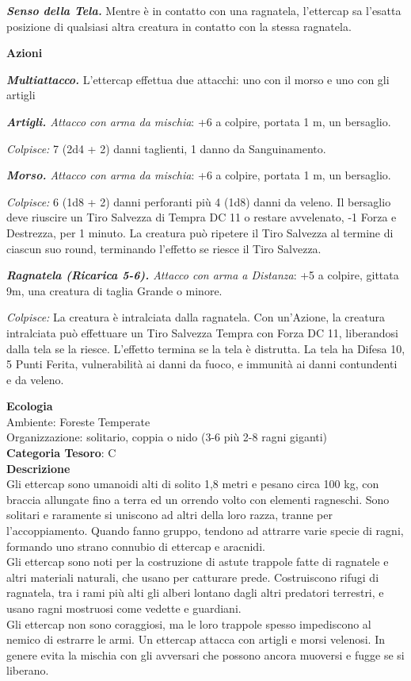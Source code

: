 \begin{multicols}{2}
{\emph{\textbf{Senso della Tela.}} Mentre è in contatto con una ragnatela, l'ettercap sa l'esatta posizione di qualsiasi altra creatura in contatto con la stessa ragnatela.

\textbf{Azioni}

\emph{\textbf{Multiattacco.}} L'ettercap effettua due attacchi: uno con il morso e uno con gli artigli

\emph{\textbf{Artigli.} Attacco con arma da mischia}: +6 a colpire, portata 1 m, un bersaglio.

\emph{Colpisce:} 7 (2d4 + 2) danni taglienti, 1 danno da Sanguinamento.

\emph{\textbf{Morso.} Attacco con arma da mischia}: +6 a colpire, portata 1 m, un bersaglio.

\emph{Colpisce:} 6 (1d8 + 2) danni perforanti più 4 (1d8) danni da veleno. Il bersaglio deve riuscire un Tiro Salvezza di Tempra DC 11 o restare avvelenato, -1 Forza e Destrezza, per 1 minuto. La creatura può ripetere il Tiro Salvezza al termine di ciascun suo round, terminando l'effetto se riesce il Tiro Salvezza.

\emph{\textbf{Ragnatela (Ricarica 5-6).} Attacco con arma a Distanza}: +5 a colpire, gittata 9m, una creatura di taglia Grande o minore.

\emph{Colpisce:} La creatura è intralciata dalla ragnatela. Con un'Azione, la creatura intralciata può effettuare un Tiro Salvezza Tempra con Forza DC 11, liberandosi dalla tela se la riesce. L'effetto termina se la tela è distrutta. La tela ha Difesa 10, 5 Punti Ferita, vulnerabilità ai danni da fuoco, e immunità ai danni contundenti e da veleno.

\textbf{Ecologia}\\
Ambiente: Foreste Temperate\\
Organizzazione: solitario, coppia o nido (3-6 più 2-8 ragni giganti)\\
\textbf{Categoria Tesoro}: C\\
\textbf{Descrizione}\\
Gli ettercap sono umanoidi alti di solito 1,8 metri e pesano circa 100 kg, con braccia allungate fino a terra ed un orrendo volto con elementi ragneschi. Sono solitari e raramente si uniscono ad altri della loro razza, tranne per l'accoppiamento. Quando fanno gruppo, tendono ad attrarre varie specie di ragni, formando uno strano connubio di ettercap e aracnidi.\\
Gli ettercap sono noti per la costruzione di astute trappole fatte di ragnatele e altri materiali naturali, che usano per catturare prede. Costruiscono rifugi di ragnatela, tra i rami più alti gli alberi lontano dagli altri predatori terrestri, e usano ragni mostruosi come vedette e guardiani.\\
Gli ettercap non sono coraggiosi, ma le loro trappole spesso impediscono al nemico di estrarre le armi. Un ettercap attacca con artigli e morsi velenosi. In genere evita la mischia con gli avversari che possono ancora muoversi e fugge se si liberano.

}
\end{multicols}
